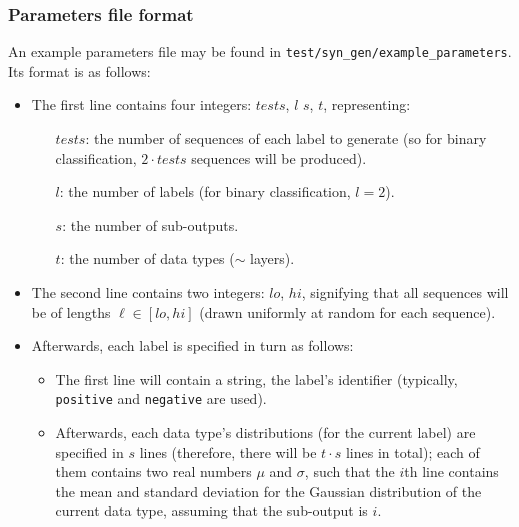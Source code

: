 \documentclass[12pt,openany]{article}
\begin{document}
	\subsubsection{Parameters file format}
	An example parameters file may be found in {\tt test/syn\_gen/example\_parameters}. Its format is as follows:
	\begin{itemize}
		\item The first line contains four integers: $tests$, $l$ $s$, $t$, representing:
		\begin{itemize}
			\item[$tests$:] the number of sequences of each label to generate (so for binary classification, $2\cdot tests$ sequences will be produced).
			\item[$l$:] the number of labels (for binary classification, $l = 2$).
			\item[$s$:] the number of sub-outputs.
			\item[$t$:] the number of data types ($\sim$ layers).
		\end{itemize}
		\item The second line contains two integers: $lo$, $hi$, signifying that all sequences will be of lengths $\ell \in [lo, hi]$ (drawn uniformly at random for each sequence).
		\item Afterwards, each label is specified in turn as follows:
		\begin{itemize}
			\item The first line will contain a string, the label's identifier (typically, {\tt positive} and {\tt negative} are used).
			\item Afterwards, each data type's distributions (for the current label) are specified in $s$ lines (therefore, there will be $t \cdot s$ lines in total); each of them contains two real numbers $\mu$ and $\sigma$, such that the $i$th line contains the mean and standard deviation for the Gaussian distribution of the current data type, assuming that the sub-output is $i$.
		\end{itemize}
	\end{itemize}
\end{document}
